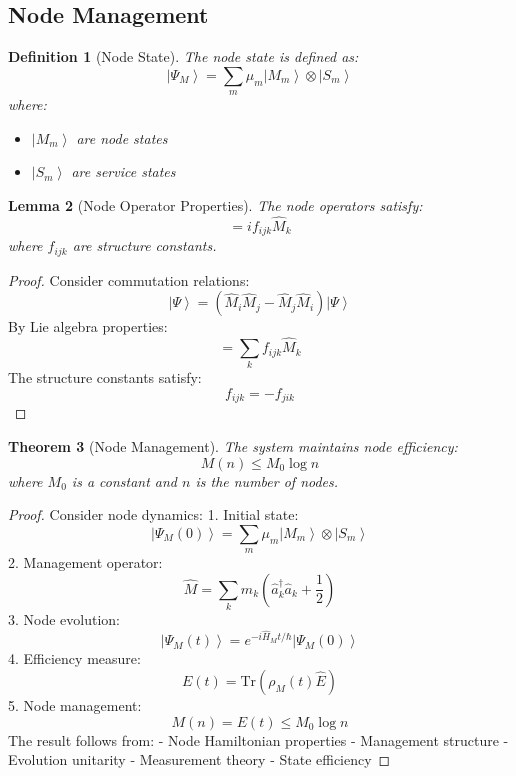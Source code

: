 \documentclass[12pt]{article}
\newcommand{\ket}[1]{\left|#1\right\rangle}
\newcommand{\tr}{\text{Tr}}
\newcommand{\op}[1]{\hat{#1}}
\newtheorem{theorem}{Theorem}[section]
\newtheorem{lemma}[theorem]{Lemma}
\newtheorem{definition}[theorem]{Definition}
\begin{document}
\subsection{Node Management}
\begin{definition}[Node State]
The node state is defined as:
\begin{equation}
\ket{\Psi_M} = \sum_m \mu_m\ket{M_m} \otimes \ket{S_m}
\end{equation}
where:
\begin{itemize}
\item $\ket{M_m}$ are node states
\item $\ket{S_m}$ are service states
\end{itemize}
\end{definition}
\begin{lemma}[Node Operator Properties]
The node operators satisfy:
\begin{equation}
[\op{M}_i,\op{M}_j] = if_{ijk}\op{M}_k
\end{equation}
where $f_{ijk}$ are structure constants.
\end{lemma}
\begin{proof}
Consider commutation relations:
\begin{equation}
[\op{M}_i,\op{M}_j]\ket{\Psi} = (\op{M}_i\op{M}_j - \op{M}_j\op{M}_i)\ket{\Psi}
\end{equation}
By Lie algebra properties:
\begin{equation}
[\op{M}_i,\op{M}_j] = \sum_k f_{ijk}\op{M}_k
\end{equation}
The structure constants satisfy:
\begin{equation}
f_{ijk} = -f_{jik}
\end{equation}
\end{proof}
\begin{theorem}[Node Management]
The system maintains node efficiency:
\begin{equation}
M(n) \leq M_0\log n
\end{equation}
where $M_0$ is a constant and $n$ is the number of nodes.
\end{theorem}
\begin{proof}
Consider node dynamics:
1. Initial state:
\begin{equation}
\ket{\Psi_M(0)} = \sum_m \mu_m\ket{M_m} \otimes \ket{S_m}
\end{equation}
2. Management operator:
\begin{equation}
\op{M} = \sum_k m_k(\op{a}_k^\dagger\op{a}_k + \frac{1}{2})
\end{equation}
3. Node evolution:
\begin{equation}
\ket{\Psi_M(t)} = e^{-i\op{H}_Mt/\hbar}\ket{\Psi_M(0)}
\end{equation}
4. Efficiency measure:
\begin{equation}
E(t) = \tr(\rho_M(t)\op{E})
\end{equation}
5. Node management:
\begin{equation}
M(n) = E(t) \leq M_0\log n
\end{equation}
The result follows from:
- Node Hamiltonian properties
- Management structure
- Evolution unitarity
- Measurement theory
- State efficiency
\end{proof}
\end{document}
